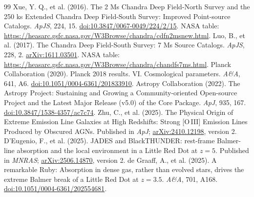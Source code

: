 \documentclass[11pt,a4paper]{article}
\begin{document}
\begin{thebibliography}{99}
 Xue, Y. Q., et al. (2016). The 2 Ms Chandra Deep Field-North Survey and the 250 ks Extended Chandra Deep Field-South Survey: Improved Point-source Catalogs. \textit{ApJS}, 224, 15. \href{https://doi.org/10.3847/0067-0049/224/2/15}{doi:10.3847/0067-0049/224/2/15}. NASA table: \url{https://heasarc.gsfc.nasa.gov/W3Browse/chandra/cdfn2msnew.html}.
 Luo, B., et al. (2017). The Chandra Deep Field-South Survey: 7 Ms Source Catalogs. \textit{ApJS}, 228, 2. \href{https://arxiv.org/abs/1611.03501}{arXiv:1611.03501}. NASA table: \url{https://heasarc.gsfc.nasa.gov/W3Browse/chandra/chandfs7ms.html}.
 Planck Collaboration (2020). Planck 2018 results. VI. Cosmological parameters. \textit{A\&A}, 641, A6. \href{https://doi.org/10.1051/0004-6361/201833910}{doi:10.1051/0004-6361/201833910}.
 Astropy Collaboration (2022). The Astropy Project: Sustaining and Growing a Community-oriented Open-source Project and the Latest Major Release (v5.0) of the Core Package. \textit{ApJ}, 935, 167. \href{https://doi.org/10.3847/1538-4357/ac7c74}{doi:10.3847/1538-4357/ac7c74}.
 Zhu, C., et al. (2025). The Physical Origin of Extreme Emission Line Galaxies at High Redshifts: Strong [O\,III] Emission Lines Produced by Obscured AGNs. Published in \textit{ApJ}; \href{https://arxiv.org/abs/2410.12198}{arXiv:2410.12198}, version 2.
 D'Eugenio, F., et al. (2025). JADES and BlackTHUNDER: rest-frame Balmer-line absorption and the local environment in a Little Red Dot at $z=5$. Published in \textit{MNRAS}; \href{https://arxiv.org/abs/2506.14870}{arXiv:2506.14870}, version 2.
 de Graaff, A., et al. (2025). A remarkable Ruby: Absorption in dense gas, rather than evolved stars, drives the extreme Balmer break of a Little Red Dot at $z=3.5$. \textit{A\&A}, 701, A168. \href{https://doi.org/10.1051/0004-6361/202554681}{doi:10.1051/0004-6361/202554681}.
\end{thebibliography}

\appendix
\end{document}
